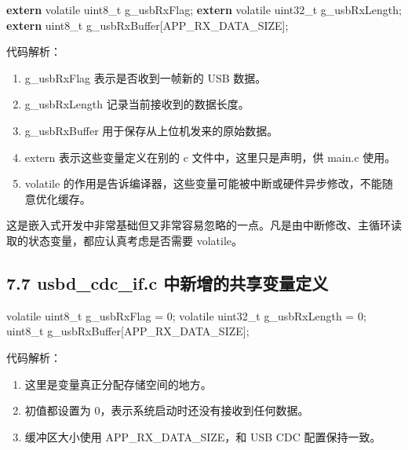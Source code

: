 \documentclass[
  chinese,
  UTF8,
  oneside,
  openany]{ctexbook}
\newenvironment{Shaded}{}{}
\newcommand{\DataTypeTok}[1]{\textcolor[rgb]{0.56,0.13,0.00}{#1}}
\newcommand{\DecValTok}[1]{\textcolor[rgb]{0.25,0.63,0.44}{#1}}
\newcommand{\KeywordTok}[1]{\textcolor[rgb]{0.00,0.44,0.13}{\textbf{#1}}}
\newcommand{\NormalTok}[1]{#1}
\newcommand{\OperatorTok}[1]{\textcolor[rgb]{0.40,0.40,0.40}{#1}}
\providecommand{\tightlist}{%
  \setlength{\itemsep}{0pt}\setlength{\parskip}{0pt}}
\begin{document}
\begin{Shaded}
\begin{Highlighting}[]
\KeywordTok{extern} \DataTypeTok{volatile} \DataTypeTok{uint8\_t}\NormalTok{ g\_usbRxFlag}\OperatorTok{;}
\KeywordTok{extern} \DataTypeTok{volatile} \DataTypeTok{uint32\_t}\NormalTok{ g\_usbRxLength}\OperatorTok{;}
\KeywordTok{extern} \DataTypeTok{uint8\_t}\NormalTok{ g\_usbRxBuffer}\OperatorTok{[}\NormalTok{APP\_RX\_DATA\_SIZE}\OperatorTok{];}
\end{Highlighting}
\end{Shaded}

代码解析：

\begin{enumerate}
\def\labelenumi{\arabic{enumi}.}
\tightlist
\item
  g\_usbRxFlag 表示是否收到一帧新的 USB 数据。
\item
  g\_usbRxLength 记录当前接收到的数据长度。
\item
  g\_usbRxBuffer 用于保存从上位机发来的原始数据。
\item
  extern 表示这些变量定义在别的 c 文件中，这里只是声明，供 main.c 使用。
\item
  volatile
  的作用是告诉编译器，这些变量可能被中断或硬件异步修改，不能随意优化缓存。
\end{enumerate}

这是嵌入式开发中非常基础但又非常容易忽略的一点。凡是由中断修改、主循环读取的状态变量，都应认真考虑是否需要
volatile。

\subsection{7.7 usbd\_cdc\_if.c
中新增的共享变量定义}\label{usbd_cdc_if.c-ux4e2dux65b0ux589eux7684ux5171ux4eabux53d8ux91cfux5b9aux4e49}

\begin{Shaded}
\begin{Highlighting}[]
\DataTypeTok{volatile} \DataTypeTok{uint8\_t}\NormalTok{ g\_usbRxFlag }\OperatorTok{=} \DecValTok{0}\OperatorTok{;}
\DataTypeTok{volatile} \DataTypeTok{uint32\_t}\NormalTok{ g\_usbRxLength }\OperatorTok{=} \DecValTok{0}\OperatorTok{;}
\DataTypeTok{uint8\_t}\NormalTok{ g\_usbRxBuffer}\OperatorTok{[}\NormalTok{APP\_RX\_DATA\_SIZE}\OperatorTok{];}
\end{Highlighting}
\end{Shaded}

代码解析：

\begin{enumerate}
\def\labelenumi{\arabic{enumi}.}
\tightlist
\item
  这里是变量真正分配存储空间的地方。
\item
  初值都设置为 0，表示系统启动时还没有接收到任何数据。
\item
  缓冲区大小使用 APP\_RX\_DATA\_SIZE，和 USB CDC 配置保持一致。
\end{enumerate}
\end{document}
